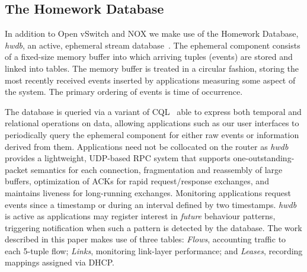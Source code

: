 
\subsection{The Homework Database} \label{s:hwdb}
 
 
In addition to Open vSwitch and NOX we make use of the Homework Database,
\emph{hwdb}, an active, ephemeral stream
database~\cite{sventek11:_infor_plane_archit_suppor_home_networ_manag}.  The
ephemeral component consists of a fixed-size memory buffer into which arriving
tuples (events) are stored and linked into tables.  The memory buffer is treated
in a circular fashion, storing the most recently received events inserted by
applications measuring some aspect of the system.  The primary ordering of
events is time of occurrence.  

The database is queried via a variant of CQL~\cite{arasu05:_cql} able to express
both temporal and relational operations on data, allowing applications such as
our user interfaces to periodically query the ephemeral component for either raw
events or information derived from them. 
Applications need not be collocated on the router as \emph{hwdb} provides a
lightweight, UDP-based RPC system that supports one-outstanding-packet semantics
for each connection, fragmentation and reassembly of large buffers, optimization
of ACKs for rapid request/response exchanges, and maintains liveness for
long-running exchanges.  Monitoring applications request events since a
timestamp or during an interval defined by two timestamps.  \emph{hwdb} is
active as applications may register interest in \emph{future} behaviour
patterns, triggering notification when such a pattern is detected by the
database.  The work described in this paper makes use of three tables:
\emph{Flows}, accounting traffic to each 5-tuple flow; \emph{Links}, monitoring
link-layer performance; and \emph{Leases}, recording mappings assigned via DHCP.

